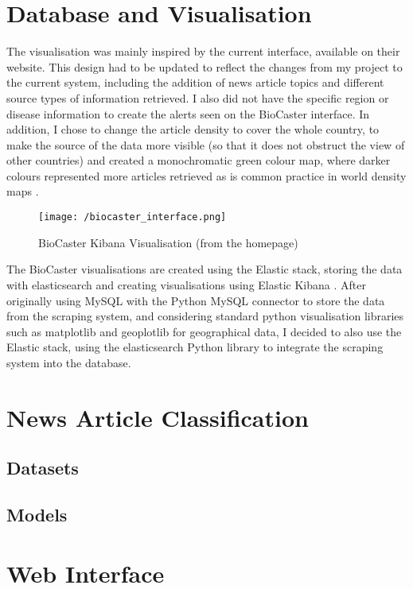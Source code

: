\documentclass{l4proj}
\begin{document}
\section{Database and Visualisation}
The visualisation was mainly inspired by the current \cite{biocaster} interface, available on their website. This design had to be updated to reflect the changes from my project to the current system, including the addition of news article topics and different source types of information retrieved. I also did not have the specific region or disease information to create the alerts seen on the BioCaster interface. In addition, I chose to change the article density to cover the whole country, to make the source of the data more visible (so that it does not obstruct the view of other countries) and created a monochromatic green colour map, where darker colours represented more articles retrieved as is common practice in world density maps \citep{ourworldindata_density, ons_density}.
\begin{figure}[h]
\texttt{[image: /biocaster\_interface.png]}
\caption{BioCaster Kibana Visualisation (from the homepage)}
\label{fig:biocaster_visualisation}
\end{figure}
\par
The BioCaster visualisations are created using the Elastic stack, storing the data with elasticsearch and creating visualisations using Elastic Kibana \citep{elastic_stack}. After originally using MySQL with the Python MySQL connector to store the data from the scraping system, and considering standard python visualisation libraries such as matplotlib \citep{Hunter:2007} and geoplotlib \citep{geoplotlib} for geographical data, I decided to also use the Elastic stack, using the elasticsearch Python library to integrate the scraping system into the database.

\section{News Article Classification}
\subsection{Datasets}
\subsection{Models}
\section{Web Interface}
\end{document}
